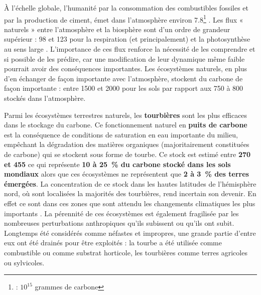 À l'échelle globale, l'humanité par la consommation des combustibles fossiles et par la production de ciment, émet dans l'atmosphère environ \SI{7.8}{\pgca}\footnote{\si{\pgc} : $10^{15}$ grammes de carbone} \citep{Ciais2014}.
Les flux « naturels » entre l'atmosphère et la biosphère sont d'un ordre de grandeur supérieur : \num{98} et \SI{123}{\pgca} pour la respiration (\coo et \chh principalement) et la photosynthèse au sens large \citep{Bond-Lamberty2010,Beer2010}. L'importance de ces flux renforce la nécessité de les comprendre et si possible de les prédire, car une modification de leur dynamique même faible pourrait avoir des conséquences importantes.
Les écosystèmes naturels, en plus d'en échanger de façon importante avec l'atmosphère, stockent du carbone de façon importante : entre \num{1500} et \SI{2000}{\pgc} pour les sols par rapport aux \num{750} à \SI{800}{\pgc} stockés dans l'atmosphère.


Parmi les écosystèmes terrestres naturels, les \textbf{tourbières} sont les plus efficaces dans le stockage du carbone.
Ce fonctionnement naturel en \textbf{puits de carbone} est la conséquence de conditions de saturation en eau importante du milieu, empêchant la dégradation des matières organiques (majoritairement constituées de carbone)  qui se stockent sous forme de tourbe.
Ce stock est estimé entre \textbf{270 et  \SI{455}{\pgc}} ce qui représente \textbf{10 à \SI{25}{\percent} du carbone stocké dans les sols mondiaux} alors que ces écosystèmes ne représentent que \textbf{2 à \SI{3}{\percent} des terres émergées}.
La concentration de ce stock dans les hautes latitudes de l'hémisphère nord, où sont localisées la majorités des tourbières, rend incertain son devenir. 
En effet ce sont dans ces zones que sont attendu les changements climatiques les plus importants \citep{Ciais2014}.
La pérennité de ces écosystèmes est également fragilisée par les nombreuses perturbations anthropiques qu'ils subissent ou qu'ils ont subit.
Longtemps été considérés comme néfastes et impropres, une grande partie d'entre eux ont été drainés pour être exploités : la tourbe a été utilisée comme combustible ou comme substrat horticole, les tourbières comme terres agricoles ou sylvicoles.

